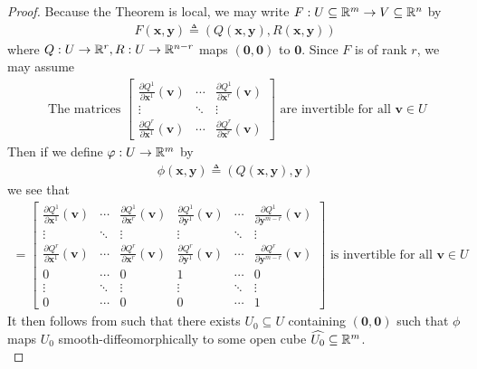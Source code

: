 \documentclass{report}
\begin{document}
\begin{proof}
Because the Theorem is local, we may write  $F:U\subseteq \mathbb{R}^m\rightarrow V\subseteq \mathbb{R}^n$ by 
\begin{align*}
F(\textbf{x},\textbf{y})\triangleq (Q(\textbf{x},\textbf{y}),R(\textbf{x},\textbf{y}))
\end{align*}
where $Q:U\rightarrow \mathbb{R}^r,R:U\rightarrow \mathbb{R}^{n-r}$ maps $(\textbf{0},\textbf{0})$ to $\textbf{0}$. Since $F$ is of rank  $r$, we may assume   
\begin{align*}
\text{ The matrices }\begin{bmatrix}
  \frac{\partial Q^1}{\partial \textbf{x}^1}(\textbf{v})& \cdots & \frac{\partial Q^1}{\partial \textbf{x}^r}(\textbf{v}) \\
  \vdots & \ddots & \vdots \\
  \frac{\partial Q^r}{\partial \textbf{x}^1}(\textbf{v})& \cdots & \frac{\partial Q^r}{\partial  \textbf{x}^r}(\textbf{v})
\end{bmatrix}\text{ are invertible for all }\textbf{v}\in U
\end{align*}
Then if we define $\varphi:U\rightarrow \mathbb{R}^m$ by 
\begin{align*}
\phi (\textbf{x},\textbf{y})\triangleq (Q(\textbf{x},\textbf{y}),\textbf{y})
\end{align*}
we see that 
\begin{align*}
[d\phi_\textbf{v}]= \begin{bmatrix}
  \frac{\partial Q^1}{\partial \textbf{x}^1}(\textbf{v}) & \cdots & \frac{\partial Q^1}{\partial \textbf{x}^r}(\textbf{v}) & \frac{\partial Q^1}{\partial \textbf{y}^1} (\textbf{v}) & \cdots & \frac{\partial Q^1}{\partial \textbf{y}^{m-r}}(\textbf{v}) \\
  \vdots & \ddots & \vdots & \vdots & \ddots & \vdots \\
  \frac{\partial Q^r}{\partial \textbf{x}^1}(\textbf{v}) & \cdots & \frac{\partial Q^r}{\partial  \textbf{x}^r}(\textbf{v}) & \frac{\partial Q^r}{\partial \textbf{y}^1} (\textbf{v}) & \cdots & \frac{\partial Q^r}{\partial \textbf{y}^{m-r}}(\textbf{v}) \\
  0 & \cdots & 0 & 1 & \cdots & 0\\
  \vdots & \ddots & \vdots & \vdots & \ddots & \vdots \\
  0 & \cdots & 0 & 0 &\cdots & 1 
\end{bmatrix}\text{ is invertible for all }\textbf{v}\in U
\end{align*}
It then follows from  such that there exists $U_0\subseteq U$ containing $(\textbf{0},\textbf{0})$ such that $\phi$ maps $U_0$ smooth-diffeomorphically to some open cube $\widehat{U_0}\subseteq \mathbb{R}^m$. \\


\end{proof}
\end{document}
